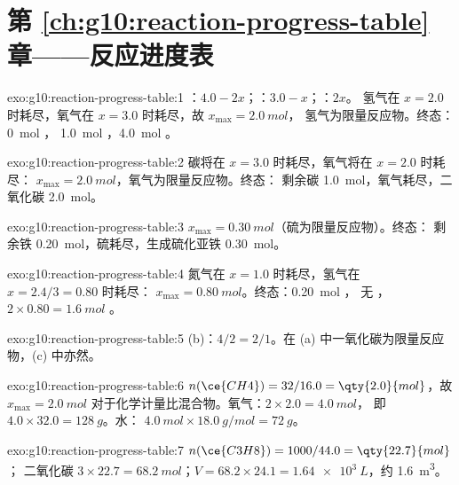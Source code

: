 \section*{第 \ref{ch:g10:reaction-progress-table} 章——反应进度表}

\begin{solution}{exo:g10:reaction-progress-table:1}
：$4.0 - 2x$；：$3.0 - x$；：$2x$。
氢气在 $x = 2.0$ 时耗尽，氧气在 $x = 3.0$ 时耗尽，故 $x_{\max} = \qty{2.0}{mol}$，
氢气为限量反应物。终态：\qty{0}{mol} ，
\qty{1.0}{mol} ，\qty{4.0}{mol} 。
\end{solution}

\begin{solution}{exo:g10:reaction-progress-table:2}
碳将在 $x = 3.0$ 时耗尽，氧气将在 $x = 2.0$ 时耗尽：
$x_{\max} = \qty{2.0}{mol}$，氧气为限量反应物。终态：
剩余碳 \qty{1.0}{mol}，氧气耗尽，二氧化碳 \qty{2.0}{mol}。
\end{solution}

\begin{solution}{exo:g10:reaction-progress-table:3}
$x_{\max} = \qty{0.30}{mol}$（硫为限量反应物）。终态：
剩余铁 \qty{0.20}{mol}，硫耗尽，生成硫化亚铁 \qty{0.30}{mol}。
\end{solution}

\begin{solution}{exo:g10:reaction-progress-table:4}
氮气在 $x = 1.0$ 时耗尽，氢气在 $x = 2.4/3 = 0.80$ 时耗尽：
$x_{\max} = \qty{0.80}{mol}$。终态：\qty{0.20}{mol} ，
无 ，$2 \times 0.80 = \qty{1.6}{mol}$ 。
\end{solution}

\begin{solution}{exo:g10:reaction-progress-table:5}
(b)：$4/2 = 2/1$。在 (a) 中一氧化碳为限量反应物，(c) 中亦然。
\end{solution}

\begin{solution}{exo:g10:reaction-progress-table:6}
$n(\ce{CH4}) = 32 / 16.0 = \qty{2.0}{mol}$，故 $x_{\max} = \qty{2.0}{mol}$
对于化学计量比混合物。氧气：$2 \times 2.0 = \qty{4.0}{mol}$，
即 $4.0 \times 32.0 = \qty{128}{g}$。水：
$\qty{4.0}{mol} \times \qty{18.0}{g/mol} = \qty{72}{g}$。
\end{solution}

\begin{solution}{exo:g10:reaction-progress-table:7}
$n(\ce{C3H8}) = 1000 / 44.0 = \qty{22.7}{mol}$；
二氧化碳 $3 \times 22.7 = \qty{68.2}{mol}$；$V = 68.2 \times 24.1 =
\qty{1.64e3}{L}$，约 \qty{1.6}{m^3}。
\end{solution}

